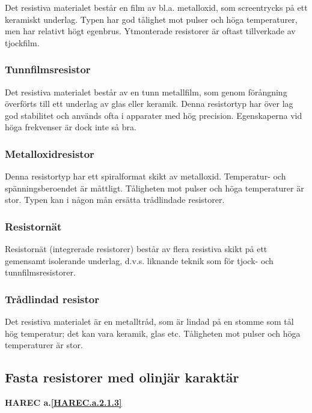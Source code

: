 Det resistiva materialet består en film av bl.a. metalloxid, som screentrycks
på ett keramiskt underlag. Typen har god tålighet mot pulser och höga
temperaturer, men har relativt högt egenbrus. Ytmonterade resistorer är oftast
tillverkade av tjockfilm.

\subsubsection{Tunnfilmsresistor}

Det resistiva materialet består av en tunn metallfilm, som genom förångning
överförts till ett underlag av glas eller keramik. Denna resistortyp har över
lag god stabilitet och används ofta i apparater med hög precision. Egenskaperna
vid höga frekvenser är dock inte så bra.

\subsubsection{Metalloxidresistor}

Denna resistortyp har ett spiralformat skikt av metalloxid. Temperatur- och
spänningsberoendet är måttligt. Tåligheten mot pulser och höga temperaturer är
stor. Typen kan i någon mån ersätta trådlindade resistorer.

\subsubsection{Resistornät}

Resistornät (integrerade resistorer) består av flera resistiva skikt på ett
gemensamt isolerande underlag, d.v.s. liknande teknik som för tjock- och
tunnfilmsresistorer.

\subsubsection{Trådlindad resistor}

Det resistiva materialet är en metalltråd, som är lindad på en stomme som tål
hög temperatur; det kan vara keramik, glas etc.
Tåligheten mot pulser och höga temperaturer är stor.

\subsection{Fasta resistorer med olinjär karaktär}
\textbf{HAREC a.\ref{HAREC.a.2.1.3}\label{myHAREC.a.2.1.3}}

